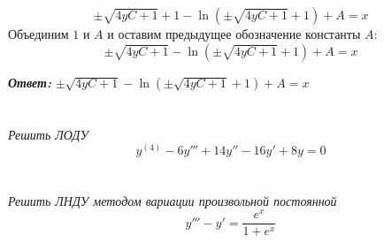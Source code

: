 \documentclass[a5paper, 10pt]{article}
\theoremstyle{definition}
\theoremstyle{plain}
\theoremstyle{remark}
\begin{document}
\begin{equation}
 \pm \sqrt{4yC + 1} + 1 - \ln \left( \pm \sqrt{4yC + 1} + 1 \right) + A = x
\end{equation}
Объединим $1$ и $A$ и оставим предыдущее обозначение константы $A$:
\begin{equation}
 \pm \sqrt{4yC + 1} - \ln \left( \pm \sqrt{4yC + 1} + 1 \right) + A = x
\end{equation}

\textbf{\textit{Ответ:}} $ \pm \sqrt{4yC + 1} - \ln \left( \pm \sqrt{4yC + 1} + 1 \right) + A = x$

\newpage
\section{}
\textit{Решить ЛОДУ}
\\
\begin{equation}
y^{(4)} - 6y'''+14y''-16y'+8y=0
\end{equation}

\newpage
\section{}
\textit{Решить ЛНДУ методом вариации произвольной постоянной}
\\
\begin{equation}
y''' -y' = \frac{e^x}{1+e^x}
\end{equation}
\end{document}
